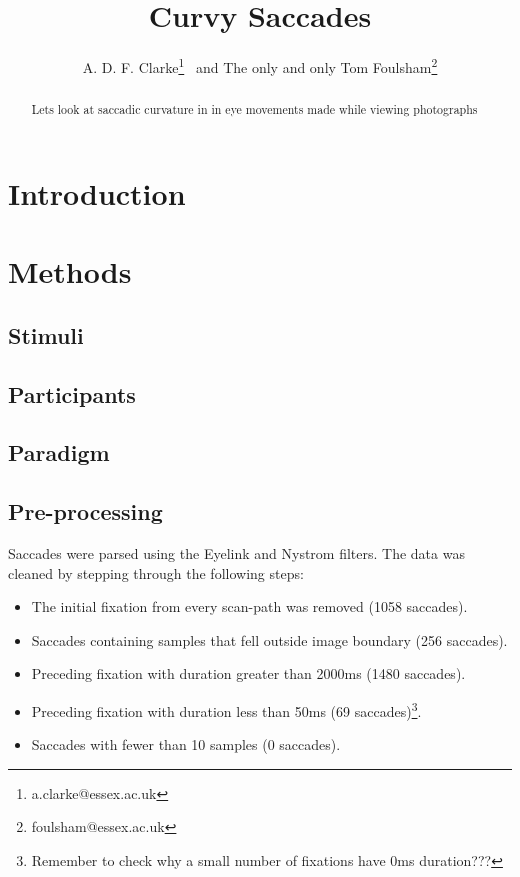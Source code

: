 \documentclass[a4paper, oneside, 11pt, onecolumn]{article}
\begin{document}
\title{Curvy Saccades}

\author{A. D. F. Clarke\thanks{a.clarke@essex.ac.uk} \ and The only and only Tom Foulsham\thanks{foulsham@essex.ac.uk}}



\maketitle

\begin{abstract}
Lets look at saccadic curvature in in eye movements made while viewing photographs
\end{abstract}

\section{Introduction}


\section{Methods}


\subsection{Stimuli}

\subsection{Participants}

\subsection{Paradigm}

\subsection{Pre-processing}

Saccades were parsed using the Eyelink and Nystrom filters. The data was cleaned by stepping through the following steps:

\begin{itemize}
\item The initial fixation from every scan-path was removed (1058 saccades).
\item Saccades containing samples that fell outside image boundary  (256 saccades).
\item Preceding fixation with duration greater than 2000ms (1480 saccades).
\item Preceding fixation with duration less than 50ms (69 saccades)\footnote{Remember to check why a small number of fixations have 0ms duration???}.
\item Saccades with fewer than 10 samples (0 saccades).
\end{itemize}
\end{document}

